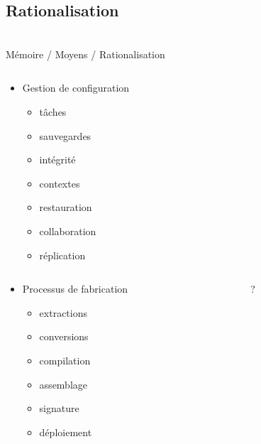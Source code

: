 \subsection{Rationalisation}\begin{frame}
{\bititle\\Mémoire / Moyens / Rationalisation}
\begin{columns}\begin{column}{.5\textwidth}
\begin{itemize}
\item<1-> Gestion de configuration
    \begin{itemize}
    \item<2-> tâches
    \item<3-> sauvegardes
    \item<4-> intégrité
    \item<5-> contextes
    \item<6-> restauration
    \item<7-> collaboration
    \item<8-> réplication
    \end{itemize}
\end{itemize}
\end{column}\begin{column}{.5\textwidth}
\end{column}\end{columns}
\begin{columns}\begin{column}{.5\textwidth}
\begin{itemize}
\item<9-> Processus de fabrication
    \begin{itemize}
    \item<10-> extractions
    \item<11-> conversions
    \item<12-> compilation
    \item<13-> assemblage
    \item<14-> signature
    \item<15-> déploiement
    \end{itemize}
\end{itemize}
\end{column}\begin{column}{.5\textwidth}
?
\end{column}\end{columns}
\end{frame}
